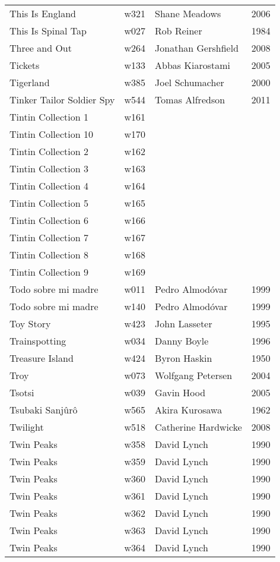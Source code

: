 \documentclass{article}
\begin{document}
\begin {center}
\begin{longtable}{p{10cm} l l l}
This Is England & w321 & Shane Meadows & 2006 \\
This Is Spinal Tap & w027 & Rob Reiner & 1984 \\
Three and Out & w264 & Jonathan Gershfield & 2008 \\
Tickets & w133 & Abbas Kiarostami & 2005 \\
Tigerland & w385 & Joel Schumacher & 2000 \\
Tinker Tailor Soldier Spy & w544 & Tomas Alfredson & 2011 \\
Tintin Collection 1 & w161 &  &  \\
Tintin Collection 10 & w170 &  &  \\
Tintin Collection 2 & w162 &  &  \\
Tintin Collection 3 & w163 &  &  \\
Tintin Collection 4 & w164 &  &  \\
Tintin Collection 5 & w165 &  &  \\
Tintin Collection 6 & w166 &  &  \\
Tintin Collection 7 & w167 &  &  \\
Tintin Collection 8 & w168 &  &  \\
Tintin Collection 9 & w169 &  &  \\
Todo sobre mi madre & w011 & Pedro Almodóvar & 1999 \\
Todo sobre mi madre & w140 & Pedro Almodóvar & 1999 \\
Toy Story & w423 & John Lasseter & 1995 \\
Trainspotting & w034 & Danny Boyle & 1996 \\
Treasure Island & w424 & Byron Haskin & 1950 \\
Troy & w073 & Wolfgang Petersen & 2004 \\
Tsotsi & w039 & Gavin Hood & 2005 \\
Tsubaki Sanjûrô & w565 & Akira Kurosawa & 1962 \\
Twilight & w518 & Catherine Hardwicke & 2008 \\
Twin Peaks & w358 & David Lynch & 1990 \\
Twin Peaks & w359 & David Lynch & 1990 \\
Twin Peaks & w360 & David Lynch & 1990 \\
Twin Peaks & w361 & David Lynch & 1990 \\
Twin Peaks & w362 & David Lynch & 1990 \\
Twin Peaks & w363 & David Lynch & 1990 \\
Twin Peaks & w364 & David Lynch & 1990 \\

\end{longtable}
\end{center}
\end{document}
